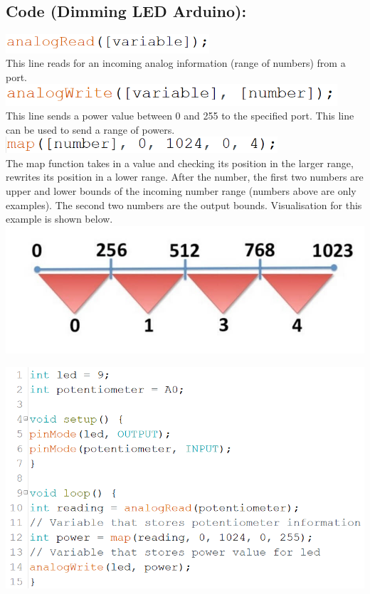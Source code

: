 \documentclass[a4paper,12pt]{report}
\newcommand{\diagramWidth}{150mm}
\newcommand{\codeHeight}{7mm}
\begin{document}
\subsection*{Code (Dimming LED Arduino):}
    \begin{mdframed}[linewidth = 3, linecolor = turbo_purple]
        \includegraphics[height = \codeHeight]{Assets/aread.png} \\
         This line reads for an incoming analog information (range of numbers) from a port. \\
         \includegraphics[height = 8mm]{Assets/awrite.png} \\ 
         This line sends a power value between 0 and 255 to the specified port. This line can be used to send a range of powers. \\
         \includegraphics[height = 6mm]{Assets/map.png} \\
         The map function takes in a value and checking its position in the larger range, rewrites its position in a lower range. After the number, the first two numbers are upper and lower bounds of the incoming number range (numbers above are only examples). The second two numbers are the output bounds. Visualisation for this example is shown below. \\
         \includegraphics[scale = 0.3]{Assets/map_diagram.jpg}
    \end{mdframed}
    \includegraphics[width = \diagramWidth]{Assets/arduino_pot.png} \\
\end{document}
